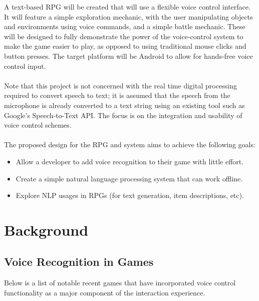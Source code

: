 \documentclass[12pt]{article}
\begin{document}
A text-based RPG will be created that will use a flexible voice control interface. It will feature a simple exploration mechanic, with the user manipulating objects and environments using voice commands, and a simple battle mechanic. These will be designed to fully demonstrate the power of the voice-control system to make the game easier to play, as opposed to using traditional mouse clicks and button presses. The target platform will be Android to allow for hands-free voice control input.
\\
\\
Note that this project is not concerned with the real time digital processing required to convert speech to text; it is assumed that the speech from the microphone is already converted to a text string using an existing tool such as Google's Speech-to-Text API. The focus is on the integration and usability of voice control schemes.
\\
\\
The proposed design for the RPG and system aims to achieve the following goals:
\begin{itemize}
\item Allow a developer to add voice recognition to their game with little effort.
\item Create a simple natural language processing system that can work offline.
\item Explore NLP usages in RPGs (for text generation, item descriptions, etc).
\end{itemize}

\newpage
\section{Background}
\subsection{Voice Recognition in Games}
Below is a list of notable recent games that have incorporated voice control functionality as a major component of the interaction experience.
\end{document}
